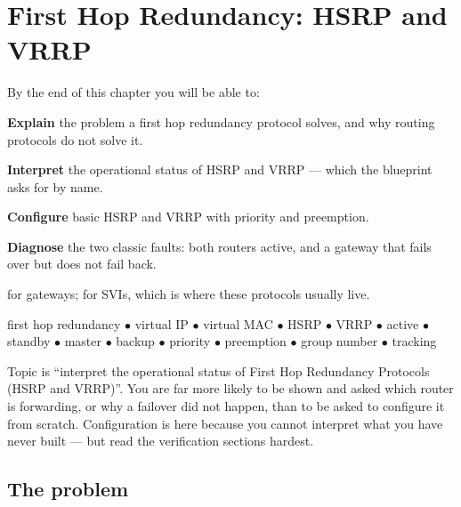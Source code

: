 \chapter{First Hop Redundancy: HSRP and VRRP}\label{ch:fhrp}

\begin{outcomes}
By the end of this chapter you will be able to:
\begin{tight}
  \item \textbf{Explain} the problem a first hop redundancy protocol solves, and
        why routing protocols do not solve it.
  \item \textbf{Interpret} the operational status of HSRP and VRRP --- which the
        blueprint asks for by name.
  \item \textbf{Configure} basic HSRP and VRRP with priority and preemption.
  \item \textbf{Diagnose} the two classic faults: both routers active, and a
        gateway that fails over but does not fail back.
\end{tight}
\end{outcomes}

\begin{prereq}
 for gateways;  for SVIs, which is where
these protocols usually live.
\end{prereq}

\begin{keyterms}
first hop redundancy $\bullet$ virtual IP $\bullet$ virtual MAC $\bullet$ HSRP
$\bullet$ VRRP $\bullet$ active $\bullet$ standby $\bullet$ master $\bullet$
backup $\bullet$ priority $\bullet$ preemption $\bullet$ group number $\bullet$
tracking
\end{keyterms}

\begin{examnote}
Topic  is ``interpret the operational status of First Hop Redundancy
Protocols (HSRP and VRRP)''. You are far more likely to be shown
 and asked which router is forwarding, or why a failover
did not happen, than to be asked to configure it from scratch. Configuration is
here because you cannot interpret what you have never built --- but read the
verification sections hardest.
\end{examnote}

\section{The problem}

